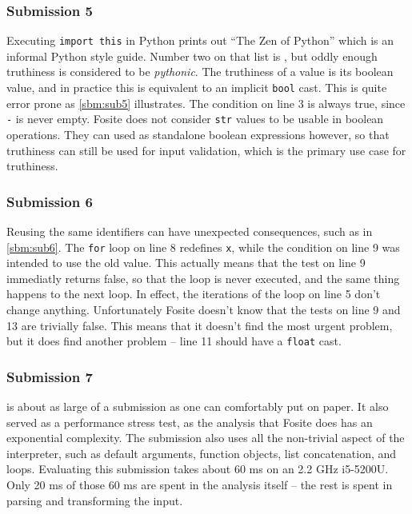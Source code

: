 \documentclass[a4paper, 16pt, oneside]{Thesis}
\begin{document}
\subsubsection{Submission 5}\label{submission-5}



Executing \texttt{import\ this} in Python prints out ``The Zen of
Python'' which is an informal Python style guide. Number two on that
list is , but oddly enough
truthiness is considered to be \emph{pythonic}. The truthiness of a
value is its boolean value, and in practice this is equivalent to an
implicit \texttt{bool} cast. This is quite error prone as
\cref{sbm:sub5} illustrates. The condition on line 3 is always true,
since \texttt{\textquotesingle{}-\textquotesingle{}} is never empty.
Fosite does not consider \texttt{str} values to be usable in boolean
operations. They can used as standalone boolean expressions however, so
that truthiness can still be used for input validation, which is the
primary use case for truthiness.

\subsubsection{Submission 6}\label{submission-6}



Reusing the same identifiers can have unexpected consequences, such as
in \cref{sbm:sub6}. The \texttt{for} loop on line 8 redefines
\texttt{x}, while the condition on line 9 was intended to use the old
value. This actually means that the test on line 9 immediatly returns
false, so that the loop is never executed, and the same thing happens to
the next loop. In effect, the iterations of the loop on line 5 don't
change anything. Unfortunately Fosite doesn't know that the tests on
line 9 and 13 are trivially false. This means that it doesn't find the
most urgent problem, but it does find another problem -- line 11 should
have a \texttt{float} cast.

\subsubsection{Submission 7}\label{submission-7}



 is about as large of a submission as one can comfortably
put on paper. It also served as a performance stress test, as the
analysis that Fosite does has an exponential complexity. The submission
also uses all the non-trivial aspect of the interpreter, such as default
arguments, function objects, list concatenation, and loops. Evaluating
this submission takes about 60 ms on an 2.2 GHz i5-5200U. Only 20 ms of
those 60 ms are spent in the analysis itself -- the rest is spent in
parsing and transforming the input.
\end{document}
